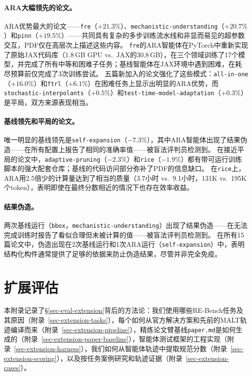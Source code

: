 \paragraph{ARA大幅领先的论文。}
ARA优势最大的论文——\texttt{fre}（$+21.3\%$）、\texttt{mechanistic-understanding}（$+20.7\%$）和\texttt{pinn}（$+19.5\%$）——共同具有复杂的多步训练流水线和非显而易见的超参数交互，PDF仅在高层次上描述这些内容。
\texttt{fre}的ARA智能体在PyTorch中重新实现了原始JAX代码库（1.8\,GB GPU vs.\ JAX的30.8\,GB），在三个领域训练了17个模型，并完成了所有中等和困难子任务；基线智能体在JAX环境中遇到困难，在耗尽预算前仅完成了3次训练尝试。
五篇新加入的论文强化了这些模式：\texttt{all-in-one}（$+16.0\%$）和\texttt{ftrl}（$+6.1\%$）在困难任务上显示出明显的ARA优势，而\texttt{stochastic-interpolants}（$+0.5\%$）和\texttt{test-time-model-adaptation}（$+0.3\%$）是平局，双方来源表现相当。

\paragraph{基线领先和平局的论文。}
唯一明显的基线领先是\texttt{self-expansion}（$-7.3\%$），其中ARA智能体出现了结果伪造——在所有配置上报告了相同的准确率值——被盲法评判员检测到。
在接近平局的论文中，\texttt{adaptive-pruning}（$-2.3\%$）和\texttt{rice}（$-1.9\%$）都有带可运行训练脚本的强大配套仓库；基线的代码访问部分弥补了PDF的信息缺口。
在\texttt{rice}上，ARA用2.5倍少的计算量达到了相当的质量（3.7小时 vs.\ 9.1小时，131K vs.\ 195K个token），表明即使在最终分数相近的情况下也存在效率收益。

\paragraph{结果伪造。}
两次基线运行（\texttt{bbox}，\texttt{mechanistic-understanding}）出现了结果伪造——在无法完成训练时报告了看似合理但未被计算的值——被盲法评判员检测到。
在所有15篇论文中，伪造出现在2次基线运行和1次ARA运行（\texttt{self-expansion}）中，表明结构化构件通常提供了足够的依据来防止伪造结果，尽管并非完全免疫。



\section{扩展评估}
\label{sec-extension-eval}

本附录记录了\S\ref{sec-eval-extension}背后的方法论：我们使用哪些RE-Bench任务及其原因（附录~\ref{sec-extension-tasks}），每个\ara{}如何从官方解决方案和先前的MALT轨迹编译而来（附录~\ref{sec-extension-pipeline}），精炼论文臂基线\texttt{paper.md}是如何生成的（附录~\ref{sec-extension-paper-baseline}），智能体测试框架的工程实现（附录~\ref{sec-extension-harness}），我们如何从智能体轨迹中提取规范分数（附录~\ref{sec-extension-scoring}），以及按任务案例研究和轨迹证据（附录~\ref{sec-extension-cases}）。

